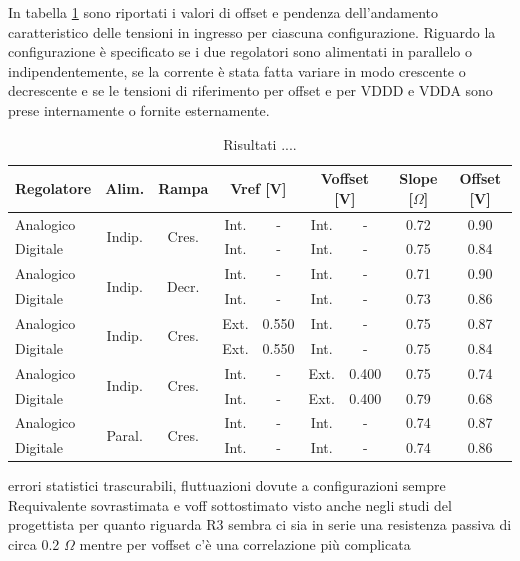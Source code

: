 In tabella \ref{table:results} sono riportati i valori di offset e pendenza dell'andamento caratteristico delle tensioni in ingresso per ciascuna configurazione. Riguardo la configurazione è specificato se i due regolatori sono alimentati in parallelo o indipendentemente, se la corrente è stata fatta variare in modo crescente o decrescente e se le tensioni di riferimento per offset e per VDDD e VDDA sono prese internamente o fornite esternamente.

\begin{center}
\begin{table}

\begin{tabular}{|l|c|c|c|c|c|c|c|c|}
\hline
Regolatore & Alim. & Rampa & \multicolumn{2}{c|}{Vref [V]} & \multicolumn{2}{c|}{Voffset [V]} & Slope [$\Omega$] & Offset [V]\\ \hline
 
Analogico & \multirow{2}{*}{Indip.} & \multirow{2}{*}{Cres.} & Int. & - & Int. & - & 0.72 & 0.90 \\
Digitale  &  &  & Int. & - & Int. & - & 0.75  & 0.84 \\ \hline

Analogico & \multirow{2}{*}{Indip.} & \multirow{2}{*}{Decr.} & Int. & - & Int. & - & 0.71 & 0.90 \\
Digitale  &  &  & Int. & - & Int. & - & 0.73  & 0.86 \\ \hline

Analogico & \multirow{2}{*}{Indip.} & \multirow{2}{*}{Cres.} & Ext. & 0.550 & Int. & - & 0.75 & 0.87 \\
Digitale  &  &  & Ext. & 0.550 & Int. & - & 0.75  & 0.84 \\ \hline

Analogico & \multirow{2}{*}{Indip.} & \multirow{2}{*}{Cres.} & Int. & - & Ext. & 0.400 & 0.75 & 0.74 \\
Digitale  &  &  & Int. & - & Ext. & 0.400 & 0.79  & 0.68 \\ \hline

Analogico & \multirow{2}{*}{Paral.} & \multirow{2}{*}{Cres.} & Int. & - & Int. & - & 0.74 & 0.87 \\
Digitale  &  &  & Int. & - & Int. & - & 0.74  & 0.86 \\ \hline
\end{tabular}
\caption{Risultati ....}
\label{table:results}
\end{table}
\end{center}

errori statistici trascurabili, fluttuazioni dovute a configurazioni 
sempre Requivalente sovrastimata e voff sottostimato
visto anche negli studi del progettista 
per quanto riguarda R3 sembra ci sia in serie una resistenza passiva di circa 0.2 $\Omega$
mentre per voffset c'è una correlazione più complicata

